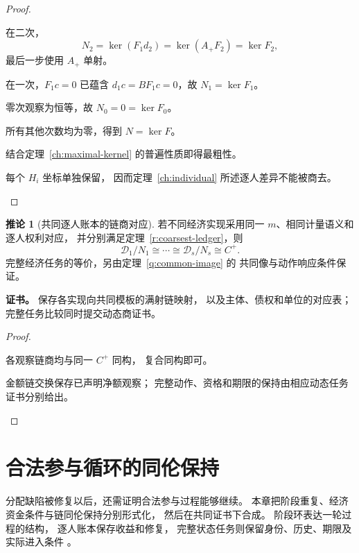 \documentclass[UTF8,12pt,a4paper,openany,fontset=none,zihao=false]{ctexrep}
\theoremstyle{definition}
\newtheorem{corollary}{推论}[chapter]
\newenvironment{certificate}{\par\noindent\textbf{证书。}\ignorespaces}{\par}
\newcommand{\1}{\mathbf 1}
\begin{document}
\begin{proof}
\begin{semanticsteps}
\item 在二次，
\[
N_2=\ker(F_1d_2)
=\ker(A_+F_2)=\ker F_2,
\]
最后一步使用 \(A_+\) 单射。
\item 在一次，\(F_1c=0\) 已蕴含
\(d_1c=BF_1c=0\)，故 \(N_1=\ker F_1\)。
\item 零次观察为恒等，故 \(N_0=0=\ker F_0\)。
\item 所有其他次数均为零，得到 \(N=\ker F\)。
\item 结合定理~\ref{ch:maximal-kernel} 的普遍性质即得最粗性。
\item 每个 \(H_i\) 坐标单独保留，
因而定理~\ref{ch:individual} 所述逐人差异不能被商去。
\end{semanticsteps}
\end{proof}
\begin{corollary}[共同逐人账本的链商对应]
\label{r:common-template}
若不同经济实现采用同一 \(m\)、相同计量语义和逐人权利对应，
并分别满足定理~\ref{r:coarsest-ledger}，则
\[
\mathcal D_1/N_1\cong\cdots\cong\mathcal D_s/N_s\cong C^+.
\]
完整经济任务的等价，另由定理~\ref{q:common-image} 的
共同像与动作响应条件保证。
\end{corollary}
\begin{certificate}
保存各实现向共同模板的满射链映射，
以及主体、债权和单位的对应表；
完整任务比较同时提交动态商证书。
\end{certificate}
\begin{proof}
\begin{semanticsteps}
\item 各观察链商均与同一 \(C^+\) 同构，
复合同构即可。
\item 金额链交换保存已声明净额观察；
完整动作、资格和期限的保持由相应动态任务证书分别给出。
\end{semanticsteps}
\end{proof}
\chapter{合法参与循环的同伦保持}
\label{cyc:chapter}

分配缺陷被修复以后，还需证明合法参与过程能够继续。
本章把阶段重复、经济资金条件与链同伦保持分别形式化，
然后在共同证书下合成。
阶段环表达一轮过程的结构，
逐人账本保存收益和修复，
完整状态任务则保留身份、历史、期限及实际进入条件
\cite{InternalTheory,InternalEconomics}。
\end{document}
